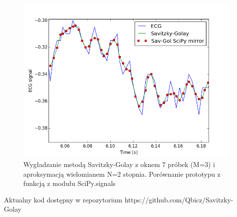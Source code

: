 \begin{figure}[!htb]
  \begin{center}
    \includegraphics[scale=0.8]
    {img/prototype.png}
  \end{center}
  \caption{Wygładzanie metodą Savitzky-Golay z oknem 7 próbek (M=3) i aproksymacją wielomianem N=2 stopnia. Porównanie prototypu z funkcją z modułu SciPy.signals}
  \label{rys:savitzky_py}
\end{figure}

Aktualny kod dostępny w repozytorium https://github.com/Qbicz/Savitzky-Golay


